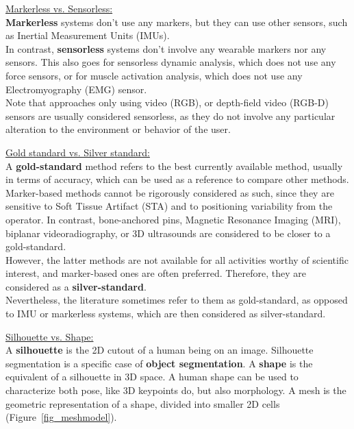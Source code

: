 \vspace*{0.5cm}

\noindent\underline{Markerless vs. Sensorless:}\\
\textbf{Markerless} systems don't use any markers, but they can use other sensors, such as Inertial Measurement Units (IMUs). \\
In contrast, \textbf{sensorless} systems don't involve any wearable markers nor any sensors. This also goes for sensorless dynamic analysis, which does not use any force sensors, or for muscle activation analysis, which does not use any Electromyography (EMG) sensor. \\
Note that approaches only using video (RGB), or depth-field video (RGB-D) sensors are usually considered sensorless, as they do not involve any particular alteration to the environment or behavior of the user.

\vspace*{0.5cm}

\noindent\underline{Gold standard vs. Silver standard:}\\
A \textbf{gold-standard} method refers to the best currently available method, usually in terms of accuracy, which can be used as a reference to compare other methods. \\
Marker-based methods cannot be rigorously considered as such, since they are sensitive to Soft Tissue Artifact (STA) and to positioning variability from the operator. In contrast, bone-anchored pins, Magnetic Resonance Imaging (MRI), biplanar videoradiography, or 3D ultrasounds are considered to be closer to a gold-standard. \\
However, the latter methods are not available for all activities worthy of scientific interest, and marker-based ones are often preferred. Therefore, they are considered as a \textbf{silver-standard}.\\
Nevertheless, the literature sometimes refer to them as gold-standard, as opposed to IMU or markerless systems, which are then considered as silver-standard.

\vspace*{0.5cm}

\noindent\underline{Silhouette vs. Shape:}\\
A \textbf{silhouette} is the 2D cutout of a human being on an image. Silhouette segmentation is a specific case of \textbf{object segmentation}. 
A \textbf{shape} is the equivalent of a silhouette in 3D space. A human shape can be used to characterize both pose, like 3D keypoints do, but also morphology. A mesh is the geometric representation of a shape, divided into smaller 2D cells (Figure~\ref{fig_meshmodel}).

